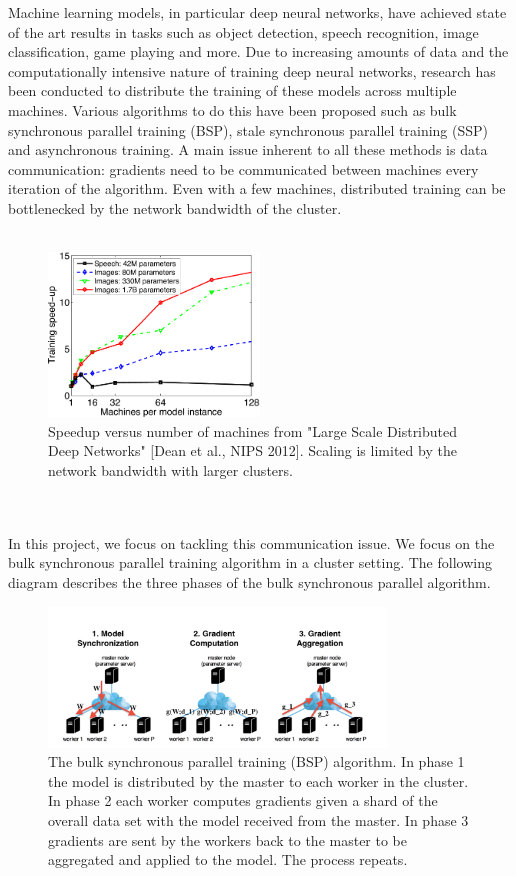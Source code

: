 \documentclass[10pt]{article}
\begin{document}
Machine learning models, in particular deep neural networks, have
achieved state of the art results in tasks such as object detection,
speech recognition, image classification, game playing and more. Due
to increasing amounts of data and the computationally intensive nature
of training deep neural networks, research has been conducted to
distribute the training of these models across multiple
machines. Various algorithms to do this have been proposed such as
bulk synchronous parallel training (BSP), stale synchronous parallel
training (SSP) and asynchronous training. A main issue inherent to all
these methods is data communication: gradients need to be
communicated between machines every iteration of the algorithm. Even
with a few machines, distributed training can be bottlenecked by the
network bandwidth of the cluster.
\\
\\
\begin{figure}[htb]
\centering
\includegraphics[width=0.5\textwidth]{./figures/figure1.png}
\caption{Speedup versus number of machines from "Large Scale Distributed Deep Networks" [Dean et al., NIPS 2012]. Scaling is limited by the network bandwidth with larger clusters.}
\end{figure}
\\
\\
In this project, we focus on tackling this communication issue. We
focus on the bulk synchronous parallel training algorithm in a cluster setting. The
following diagram describes the three phases of the bulk synchronous parallel algorithm.
\\
\begin{figure}[htb]
\centering
\includegraphics[width=0.8\textwidth]{./figures/figure2.png}
\caption{The bulk synchronous parallel training (BSP) algorithm. In phase 1 the model is distributed by the master to each worker in the cluster. In phase 2 each worker computes gradients given a shard of the overall data set with the model received from the master. In phase 3 gradients are sent by the workers back to the master to be aggregated and applied to the model. The process repeats.}
\end{figure}
\end{document}
